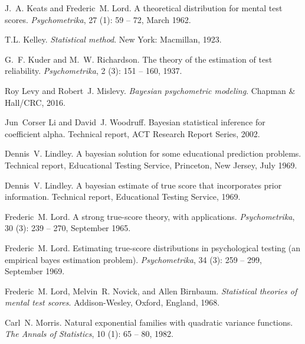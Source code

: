 \documentclass[12pt,epsfig]{article}
\begin{document}
\begin{thebibliography}{28}
J.~A. Keats and Frederic~M. Lord.
\newblock A theoretical distribution for mental test scores.
\newblock \emph{Psychometrika}, 27 (1): 59 -- 72, March 1962.

T.L. Kelley.
\newblock \emph{Statistical method}.
\newblock New York: Macmillan, 1923.

G.~F. Kuder and M.~W. Richardson.
\newblock The theory of the estimation of test reliability.
\newblock \emph{Psychometrika}, 2 (3): 151 -- 160, 1937.

Roy Levy and Robert~J. Mislevy.
\newblock \emph{Bayesian psychometric modeling}.
\newblock Chapman \& Hall/CRC, 2016.

Jun~Corser Li and David~J. Woodruff.
\newblock Bayesian statistical inference for coefficient alpha.
\newblock Technical report, ACT Research Report Series, 2002.

Dennis~V. Lindley.
\newblock A bayesian solution for some educational prediction problems.
\newblock Technical report, Educational Testing Service, Princeton, New Jersey,
  July 1969{}.

Dennis~V. Lindley.
\newblock A bayesian estimate of true score that incorporates prior
  information.
\newblock Technical report, Educational Testing Service, 1969{}.

Frederic~M. Lord.
\newblock A strong true-score theory, with applications.
\newblock \emph{Psychometrika}, 30 (3): 239 -- 270, September
  1965.

Frederic~M. Lord.
\newblock Estimating true-score distributions in psychological testing (an
  empirical bayes estimation problem).
\newblock \emph{Psychometrika}, 34 (3): 259 -- 299, September
  1969.

Frederic~M. Lord, Melvin~R. Novick, and Allen Birnbaum.
\newblock \emph{Statistical theories of mental test scores}.
\newblock Addison-Wesley, Oxford, England, 1968.

Carl~N. Morris.
\newblock Natural exponential families with quadratic variance functions.
\newblock \emph{The Annals of Statistics}, 10 (1): 65 -- 80,
  1982.


\end{thebibliography}
\end{document}
